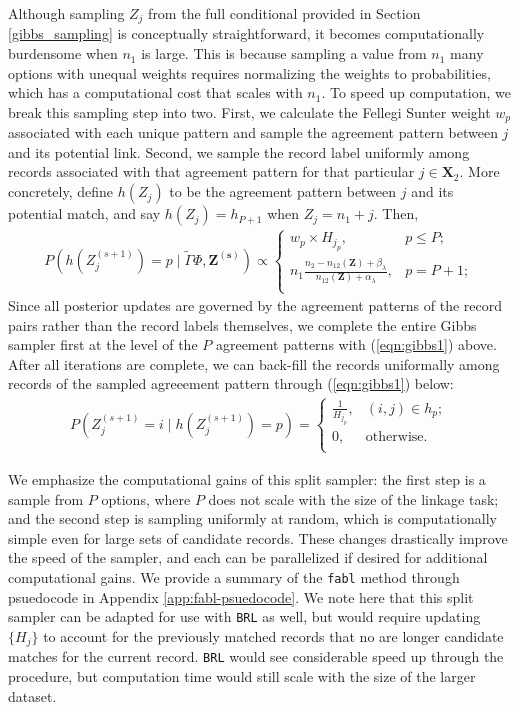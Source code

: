 \documentclass[ba]{imsart}
\begin{document}
Although sampling \(Z_j\) from the full conditional provided in Section \ref{gibbs_sampling} is conceptually straightforward, it becomes computationally burdensome when $n_1$ is large. This is because sampling a value from $n_1$ many options with unequal weights requires normalizing the weights to probabilities, which has a computational cost that scales with $n_1$. To speed up computation, we break this sampling step into two. First, we calculate the Fellegi Sunter weight \(w_{p}\) associated with each unique pattern and sample the agreement pattern between \(j\) and its potential link. Second, we sample the record label uniformly among records associated with that agreement pattern for that particular \(j\in \bm{X}_2\). More concretely, define \(h(Z_j)\) to be the agreement pattern between \(j\) and its potential match, and say \(h(Z_j) = h_{P+1}\) when \(Z_j = n_1 + j\). Then,
	\begin{align}
		\label{eqn:gibbs1}
		P\left(h\left(Z_j^{(s+1)}\right) = p \mid\tilde{\Gamma} \Phi, \bm{Z^{(s)}}\right) \propto
		\begin{cases} 
			w_{p}\times H_{j_p},  & p \leq P; \\
			n_1 \frac{n_2 - n_{12}(\bm{Z}) + \beta_{\lambda}}{n_{12}(\bm{Z}) + \alpha_{\lambda}}, &   p = P + 1; \\
		\end{cases}
	\end{align}
	Since all posterior updates are governed by the agreement patterns of the record pairs rather than the record labels themselves, we complete the entire Gibbs sampler first at the level of the \(P\) agreement patterns with (\ref{eqn:gibbs1}) above. After all iterations are complete, we can back-fill the records uniformally among records of the sampled agreeement pattern through (\ref{eqn:gibbs1}) below:
	\begin{align}
		\label{eqn:gibbs2}
		P\left(Z_j^{(s+1)} = i \mid h\left(Z_j^{(s+1)}\right) = p\right) = \begin{cases} 
			\frac{1}{H_{j_p}}, & (i, j) \in h_p; \\
			0, & \text{otherwise.} \\
		\end{cases}
	\end{align} 
	
	We emphasize the computational gains of this split sampler: the first step is a sample from $P$ options, where $P$ does not scale with the size of the linkage task; and the second step is sampling uniformly at random, which is computationally simple even for large sets of candidate records. These changes drastically improve the speed of the sampler, and each can be parallelized if desired for additional computational gains. We provide a summary of the \texttt{fabl} method through psuedocode in Appendix \ref{app:fabl-psuedocode}. We note here that this split sampler can be adapted for use with \texttt{BRL} as well, but would require updating $\{H_j\}$ to account for the previously matched records that no are longer candidate matches for the current record. \texttt{BRL} would see considerable speed up through the procedure, but computation time would still scale with the size of the larger dataset.
	
\end{document}
